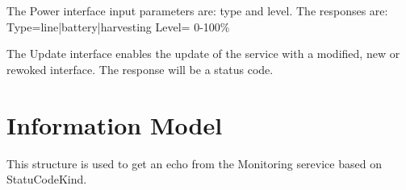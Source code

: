 \documentclass[a4paper]{arrowhead}
\begin{document}

The Power interface input parameters are: type and level.
The responses are:
Type=line|battery|harvesting
Level= 0-100\%



The Update interface enables the update of the service with a modified,
new or rewoked interface. The response will be a status code. 



\section{Information Model}
\label{sec:model}






This structure is used to get an echo from the Monitoring serevice
based on StatuCodeKind.
 
\end{document}
